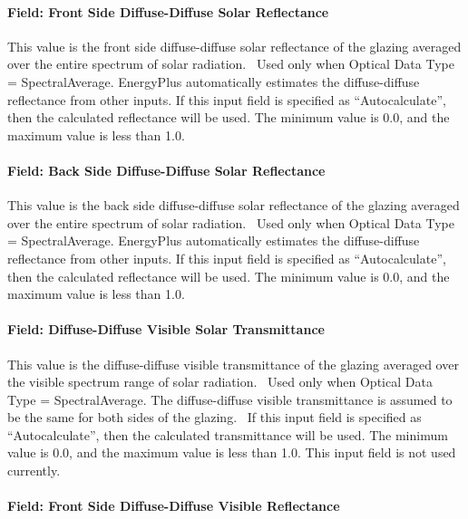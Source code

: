 \paragraph{Field: Front Side Diffuse-Diffuse Solar Reflectance}\label{field-front-side-diffuse-diffuse-solar-reflectance}

This value is the front side diffuse-diffuse solar reflectance of the glazing averaged over the entire spectrum of solar radiation.~ Used only when Optical Data Type = SpectralAverage. EnergyPlus automatically estimates the diffuse-diffuse reflectance from other inputs. If this input field is specified as ``Autocalculate'', then the calculated reflectance will be used. The minimum value is 0.0, and the maximum value is less than 1.0.

\paragraph{Field: Back Side Diffuse-Diffuse Solar Reflectance}\label{field-back-side-diffuse-diffuse-solar-reflectance}

This value is the back side diffuse-diffuse solar reflectance of the glazing averaged over the entire spectrum of solar radiation.~ Used only when Optical Data Type = SpectralAverage. EnergyPlus automatically estimates the diffuse-diffuse reflectance from other inputs. If this input field is specified as ``Autocalculate'', then the calculated reflectance will be used. The minimum value is 0.0, and the maximum value is less than 1.0.

\paragraph{Field: Diffuse-Diffuse Visible Solar Transmittance}\label{field-diffuse-diffuse-visible-solar-transmittance}

This value is the diffuse-diffuse visible transmittance of the glazing averaged over the visible spectrum range of solar radiation.~ Used only when Optical Data Type = SpectralAverage. The diffuse-diffuse visible transmittance is assumed to be the same for both sides of the glazing.~ If this input field is specified as ``Autocalculate'', then the calculated transmittance will be used. The minimum value is 0.0, and the maximum value is less than 1.0. This input field is not used currently.

\paragraph{Field: Front Side Diffuse-Diffuse Visible Reflectance}\label{field-front-side-diffuse-diffuse-visible-reflectance}

